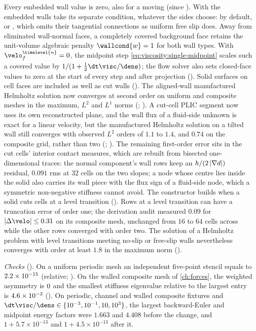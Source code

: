Every embedded wall value is zero, also for a moving 
(since ). With  the embedded
walls take its separate  condition, whatever the sides choose:
\code{()} by default, or \code{()}, which
omits their tangential connections as uniform free slip does. Away from
eliminated wall-normal faces, a completely covered background face retains the
unit-volume algebraic penalty $\wallcond{w}=1$ for both wall types. With
$\velo^{\timelevel{n}}_f=0$, the midpoint step
\cref{eq:viscosity:single-midpoint} scales such a covered value by
$1/(1+\tfrac12\dt\visc/\dens)$; the flow solver also sets closed-face values
to zero at the start of every step and after projection
(). Solid surfaces on cell faces are included
as well as cut walls (). The aligned-wall manufactured Helmholtz
solution now converges at second order on uniform and composite meshes in the
maximum, $L^2$ and $L^1$ norms (;
). A cut-cell PLIC segment now uses
its own reconstructed plane, and the wall flux of a fluid-side unknown is
exact for a linear velocity, but the manufactured Helmholtz solution on a
tilted wall still converges with observed $L^2$ orders of $1.1$ to $1.4$, and
$0.74$ on the composite grid, rather than two (;
). The remaining first-order error
sits in the cut cells' interior contact measures, which are rebuilt from
bisected one-dimensional traces: the normal component's wall rows keep an
$h/(2\left\lvert \nabla d \right\rvert)$ residual, $0.091$ rms at $32$ cells on the two slopes; a node whose centre lies inside the solid
also carries its wall piece with the flux sign of a fluid-side node, which a
symmetric non-negative stiffness cannot avoid.
The constructor builds when a solid cuts cells at a level transition
(). Rows at a level transition can have a truncation error of order
one; the derivation audit measured $0.09$ for $\abs{\Delta\velo}\le0.31$ on
its composite mesh, unchanged from $16$ to $64$ cells across while the other
rows converged with order two. The solution of a Helmholtz problem with level
transitions meeting no-slip or free-slip walls nevertheless converges with
order at least $1.8$ in the maximum norm ().

\begin{sloppypar}
\emph{Checks} (). On a uniform periodic mesh an
independent five-point stencil equals  to
$2.2\times10^{-15}$ (relative; ). On the walled
composite mesh of \cref{ch:forces}, the weighted asymmetry is
$0$ and the smallest stiffness eigenvalue relative to the
largest entry is $4.6\times10^{-3}$ ().
On periodic, channel and walled composite fixtures and
$\dt\visc/\dens\in\{10^{-3},10^{-1},10,10^3\}$, the largest backward-Euler
and midpoint energy factors were $1.663$ and $4.408$ before the change,
and $1+5.7\times10^{-13}$ and $1+4.5\times10^{-13}$ after it.
\end{sloppypar}

